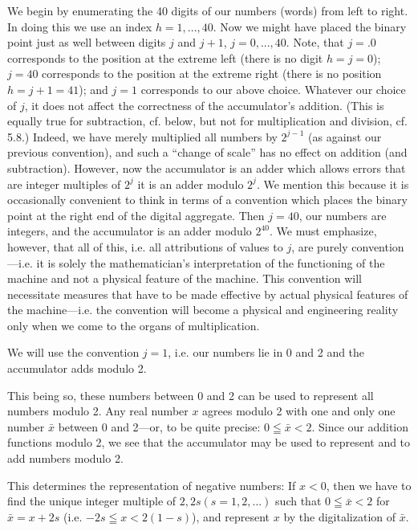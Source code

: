\documentclass[12pt]{amsart}
\begin{document}
We begin by enumerating the 40 digits of our numbers (words) from left to right. In doing this we use an index $h = 1, ... , 40$. Now we might have placed the binary point just as well between digits $j$ and $j + 1$, $j = 0, ... , 40$. Note, that $j = .0$ corresponds to the position at the extreme left (there is no digit $h = j = 0$); $j = 40$ corresponds to the position at the extreme right (there is no position $h = j + 1 = 41$); and $j = 1$ corresponds to our above choice. Whatever our choice of $j$, it does not affect the correctness of the accumulator's addition. (This is equally true for subtraction, cf. below, but not for multiplication and division, cf. 5.8.) Indeed, we have merely multiplied all numbers by $2^{j-1}$ (as against our previous convention), and such a ``change of scale'' has no effect on addition (and subtraction). However, now the accumulator is an adder which allows errors that are integer multiples of $2^j$ it is an adder modulo $2^j$. We mention this because it is occasionally convenient to think in terms of a convention which places the binary point at the right end of the digital aggregate. Then $j = 40$, our numbers are integers, and the accumulator is an adder modulo $2^{40}$. We must emphasize, however, that all of this, i.e. all attributions of values to $j$, are purely convention---i.e. it is solely the mathematician's interpretation of the functioning of the machine and not a physical feature of the machine. This convention will necessitate measures that have to be made effective by actual physical features of the machine---i.e. the convention will become a physical and engineering reality only when we come to the organs of multiplication.

We will use the convention $j = 1$, i.e. our numbers lie in 0 and 2 and the accumulator adds modulo 2.

This being so, these numbers between 0 and 2 can be used to represent all numbers modulo 2. Any real number $x$ agrees modulo 2 with one and only one number $\bar{x}$ between 0 and 2---or, to be quite precise: $0 \leqq \bar{x} < 2$. Since our addition functions modulo 2, we see that the accumulator may be used to represent and to add numbers modulo 2.

This determines the representation of negative numbers: If $x < 0$, then we have to find the unique integer multiple of $2, 2s (s = 1, 2, ...)$ such that $0 \leqq \bar{x} < 2$ for $\bar{x} = x + 2s$ (i.e. $-2s \leqq x < 2(1 - s)$),  and represent $x$ by the digitalization of $\bar{x}$.
\end{document}
